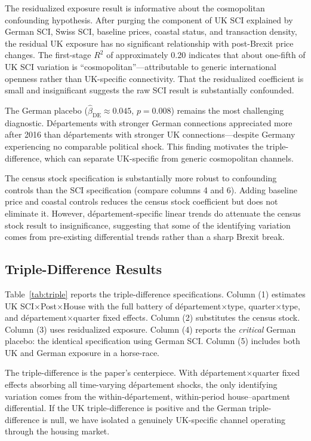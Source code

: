 \documentclass[12pt]{article}
\begin{document}
The residualized exposure result is informative about the cosmopolitan confounding hypothesis. After purging the component of UK SCI explained by German SCI, Swiss SCI, baseline prices, coastal status, and transaction density, the residual UK exposure has no significant relationship with post-Brexit price changes. The first-stage $R^2$ of approximately 0.20 indicates that about one-fifth of UK SCI variation is ``cosmopolitan''---attributable to generic international openness rather than UK-specific connectivity. That the residualized coefficient is small and insignificant suggests the raw SCI result is substantially confounded.

The German placebo ($\hat{\beta}_{\text{DE}} \approx 0.045$, $p = 0.008$) remains the most challenging diagnostic. D\'epartements with stronger German connections appreciated more after 2016 than d\'epartements with stronger UK connections---despite Germany experiencing no comparable political shock. This finding motivates the triple-difference, which can separate UK-specific from generic cosmopolitan channels.

The census stock specification is substantially more robust to confounding controls than the SCI specification (compare columns 4 and 6). Adding baseline price and coastal controls reduces the census stock coefficient but does not eliminate it. However, d\'epartement-specific linear trends do attenuate the census stock result to insignificance, suggesting that some of the identifying variation comes from pre-existing differential trends rather than a sharp Brexit break.

\subsection{Triple-Difference Results}

Table~\ref{tab:triple} reports the triple-difference specifications. Column (1) estimates UK SCI$\times$Post$\times$House with the full battery of d\'epartement$\times$type, quarter$\times$type, and d\'epartement$\times$quarter fixed effects. Column (2) substitutes the census stock. Column (3) uses residualized exposure. Column (4) reports the \textit{critical} German placebo: the identical specification using German SCI. Column (5) includes both UK and German exposure in a horse-race.

{\footnotesize}

The triple-difference is the paper's centerpiece. With d\'epartement$\times$quarter fixed effects absorbing all time-varying d\'epartement shocks, the only identifying variation comes from the within-d\'epartement, within-period house--apartment differential. If the UK triple-difference is positive and the German triple-difference is null, we have isolated a genuinely UK-specific channel operating through the housing market.
\end{document}
